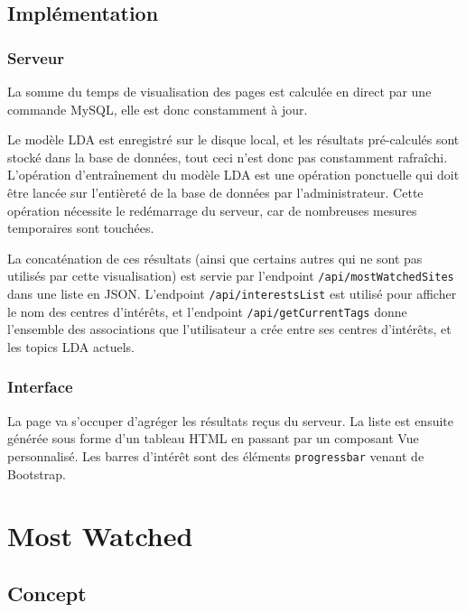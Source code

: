 	\subsection{Implémentation}

		\subsubsection{Serveur}

			La somme du temps de visualisation des pages est calculée en direct par une commande MySQL, elle est donc constamment à jour.

			Le modèle LDA est enregistré sur le disque local, et les résultats pré-calculés sont stocké dans la base de données, tout ceci n'est donc pas constamment rafraîchi. L'opération d'entraînement du modèle LDA est une opération ponctuelle qui doit être lancée sur l'entièreté de la base de données par l'administrateur. Cette opération nécessite le redémarrage du serveur, car de nombreuses mesures temporaires sont touchées.

			La concaténation de ces résultats (ainsi que certains autres qui ne sont pas utilisés par cette visualisation) est servie par l'endpoint \texttt{/api/mostWatchedSites} dans une liste en JSON. L'endpoint \texttt{/api/interestsList} est utilisé pour afficher le nom des centres d'intérêts, et l'endpoint \texttt{/api/getCurrentTags} donne l'ensemble des associations que l'utilisateur a crée entre ses centres d'intérêts, et les topics LDA actuels.

		\subsubsection{Interface}

			La page va s'occuper d'agréger les résultats reçus du serveur. La liste est ensuite générée sous forme d'un tableau HTML en passant par un composant Vue personnalisé. Les barres d'intérêt sont des éléments \texttt{progressbar} venant de Bootstrap.

\clearpage

%
%
%
%

\section{Most Watched}

	\subsection{Concept}

